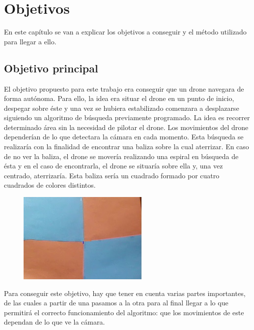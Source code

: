 \chapter{Objetivos}\label{cap.Objetivos}
En este cap\'itulo se van a explicar los objetivos a conseguir y el m\'etodo utilizado para llegar a ello.

\section{Objetivo principal}
\hspace{1 cm} El objetivo propuesto para este trabajo era conseguir que un drone navegara de forma aut\'onoma. Para ello, la idea era situar el drone en un punto de inicio, despegar sobre \'este y una vez se hubiera estabilizado comenzara a desplazarse siguiendo un algoritmo de b\'usqueda previamente programado. La idea es recorrer determinado \'area sin la necesidad de pilotar el drone. Los movimientos del drone depender\'ian de lo que detectara la c\'amara en cada momento. Esta b\'usqueda se realizar\'ia con la finalidad de encontrar una baliza sobre la cual aterrizar. En caso de no ver la baliza, el drone se mover\'ia realizando una espiral en b\'usqueda de \'esta y en el caso de encontrarla, el drone se situar\'ia sobre ella y, una vez centrado, aterrizar\'ia. Esta baliza ser\'ia un cuadrado formado por cuatro cuadrados de colores distintos. 

\begin{figure}[H]
	\centering
		\includegraphics{imgs/baliza.jpg}
	\label{fig:Baliza elegida sobre la que aterrizar. }
\end{figure}

\hspace{1 cm} Para conseguir este objetivo, hay que tener en cuenta varias partes importantes, de las cuales a partir de una pasamos a la otra para al final llegar a lo que permitir\'a el correcto funcionamiento del algoritmo: que los movimientos de este dependan de lo que ve la c\'amara.

